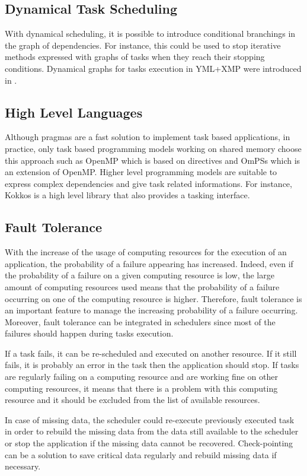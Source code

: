 \subsection{Dynamical Task Scheduling}
With dynamical scheduling, it is possible to introduce conditional branchings in the graph of dependencies.
For instance, this could be used to stop iterative methods expressed with graphs of tasks when they reach their stopping conditions.
Dynamical graphs for tasks execution in YML+XMP were introduced in \cite{Wu2019}.


\subsection{High Level Languages}
Although pragmas are a fast solution to implement task based applications, in practice, only task based programming models working on shared memory choose this approach such as OpenMP which is based on directives and OmPSs which is an extension of OpenMP.
Higher level programming models are suitable to express complex dependencies and give task related informations.
For instance, Kokkos is a high level library that also provides a tasking interface.

\subsection{Fault Tolerance}
With the increase of the usage of computing resources for the execution of an application, the probability of a failure appearing has increased.
Indeed, even if the probability of a failure on a given computing resource is low, the large amount of computing resources used means that the probability of a failure occurring on one of the computing resource is higher.
Therefore, fault tolerance is an important feature to manage the increasing probability of a failure occurring.
Moreover, fault tolerance can be integrated in schedulers since most of the failures should happen during tasks execution.

If a task fails, it can be re-scheduled and executed on another resource.
If it still fails, it is probably an error in the task then the application should stop.
If tasks are regularly failing on a computing resource and are working fine on other computing resources, it means that there is a problem with this computing resource and it should be excluded from the list of available resources.

In case of missing data, the scheduler could re-execute previously executed task in order to rebuild the missing data from the data still available to the scheduler or stop the application if the missing data cannot be recovered.
Check-pointing can be a solution to save critical data regularly and rebuild missing data if necessary.

